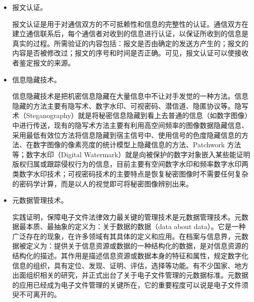 \begin{enumerate}
\begin{itemize}
        \item  报文认证。

        报文认证是用于对通信双方的不可抵赖性和信息的完整性的认证。通信双方在建立通信联系后，每个通信者对收到的信息进行认证，以保证所收到的信息是真实的过程。所需验证的内容包括：报文是否由确定的发送方产生的；报文的内容是否被修改过；报文的序号和时间是否正确。可见，报文认证可以使接收者鉴定报文的来源。

        \item  信息隐藏技术。

        信息隐藏技术是把机密信息隐藏在大量信息中不让对手发觉的一种方法。信息隐藏的方法主要有隐写术、数字水印、可视密码、潜信道、隐匿协议等。隐写术（Steganography）就是将秘密信息隐藏到看上去普通的信息（如数字图像）中进行传送，现有的隐写术方法主要有利用高空间频率的图像数据隐藏信息、采用最低有效位方法将信息隐藏到宿主信号中、使用信号的色度隐藏信息的方法、在数字图像的像素亮度的统计模型上隐藏信息的方法、Patchwork 方法等；数字水印（Digital Watermark）就是向被保护的数字对象嵌入某些能证明版权归属或跟踪侵权行为的信息，目前主要有空间数字水印和频率数字水印两类数字水印技术；可视密码技术的主要特点是恢复秘密图像时不需要任何复杂的密码学计算，而是以人的视觉即可将秘密图像辨别出来。

        \item  元数据管理技术。

        实践证明，保障电子文件法律效力最关键的管理技术是元数据管理技术。元数据最本质、最抽象的定义为：关于数据的数据（data about data）。它是一种广泛存在的现象，在许多领域有其具体的定义和应用。在档案与信息界，元数据被定义为：提供关于信息资源或数据的一种结构化的数据，是对信息资源的结构化的描述。其作用是描述信息资源或数据本身的特征和属性，规定数字化信息的组织，具有定位、发现、证明、评估，选择等功能。有不少国家、地方出面组织相关的研究，并正式出台了关于电子文件管理的元数据标准。元数据的应用已经成为电子文件管理的关键所在，它的重要程度可以说是电子文件须臾不可离开的。
        \end{itemize}
    \end{enumerate}
